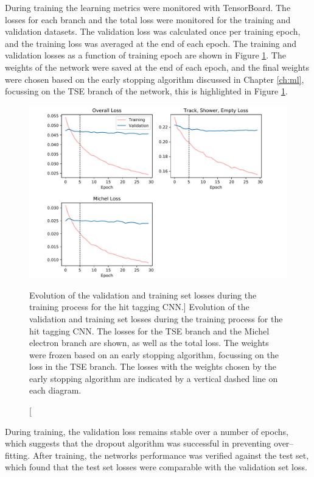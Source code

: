 During training the learning metrics were monitored with TensorBoard. The
losses for each branch and the total loss were monitored for the training
and validation datasets. The validation loss was calculated once per training
epoch, and the training loss was averaged at the end of each epoch. The 
training and validation losses as a function of training epoch are shown in 
Figure \ref{fig:training}.  The weights of the network were saved at the end 
of each epoch, and the final weights were chosen based on the early stopping 
algorithm discussed in Chapter \ref{ch:ml}, focussing on the TSE branch of the 
network, this is highlighted in Figure \ref{fig:training}.
\begin{figure}
	\centering
	\includegraphics[width=\textwidth]{figures/losses_prelu.pdf}
	\caption
	[Evolution of the validation and training set losses during the training 
	process for the hit tagging CNN.]
	{Evolution of the validation and training set losses during the training 
	process for the hit tagging CNN. The losses for the TSE branch and the Michel 
	electron branch are shown, as well as the total loss. The weights were frozen 
	based on an early stopping algorithm, focussing on the loss in the TSE 
	branch. The losses with the weights chosen by the early stopping algorithm 
	are indicated by a vertical dashed line on each diagram.} 
	\label{fig:training}
\end{figure}

During training, the validation loss remains stable over a number of epochs,
which suggests that the dropout algorithm was successful in preventing 
over--fitting. After training, the networks performance was verified against 
the test set, which found that the test set losses were comparable with the 
validation set loss. 

